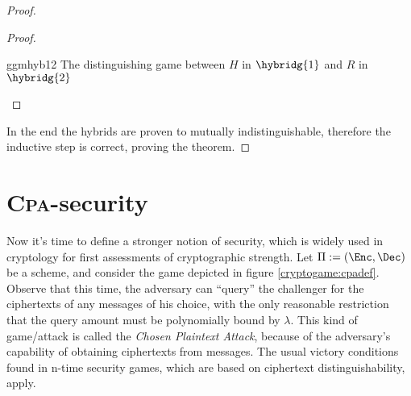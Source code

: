 \begin{proof}
\begin{proof}
        \begin{cryptogame}
            {ggmhyb12}
            {The distinguishing game between $H$ in $\hybridg{1}$ and $R$ in $\hybridg{2}$}
            {}


            \cseqdelay


            \cseqdelay


            \cseqdelay


        \end{cryptogame}
        
    \end{proof}

    In the end the hybrids are proven to mutually indistinguishable, therefore the inductive step is correct, proving the theorem.

\end{proof}

\section{\textsc{Cpa}-security}

Now it's time to define a stronger notion of security, which is widely used in cryptology for first assessments of cryptographic strength. Let $\Pi := (\Enc, \Dec)$ be a \ske{} scheme, and consider the game depicted in figure \ref{cryptogame:cpadef}. Observe that this time, the adversary can ``query'' the challenger for the ciphertexts of any messages of his choice, with the only reasonable restriction that the query amount must be polynomially bound by $\lambda$. This kind of game/attack is called the \emph{Chosen Plaintext Attack}, because of the adversary's capability of obtaining ciphertexts from messages. The usual victory conditions found in n-time security games, which are based on ciphertext distinguishability, apply.

